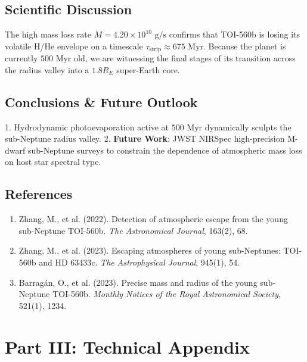 \documentclass[11pt,a4paper]{article}
\begin{document}
\subsection{Scientific Discussion}
The high mass loss rate $\dot{M} = 4.20 \times 10^{10}\text{ g/s}$ confirms that TOI-560b is losing its volatile H/He envelope on a timescale $\tau_{\text{strip}} \approx 675\text{ Myr}$. Because the planet is currently $500\text{ Myr}$ old, we are witnessing the final stages of its transition across the radius valley into a $1.8 R_E$ super-Earth core.

\subsection{Conclusions \& Future Outlook}
1. Hydrodynamic photoevaporation active at $500\text{ Myr}$ dynamically sculpts the sub-Neptune radius valley.
2. \textbf{Future Work}: JWST NIRSpec high-precision M-dwarf sub-Neptune surveys to constrain the dependence of atmospheric mass loss on host star spectral type.

\subsection*{References}
\begin{enumerate}
    \item Zhang, M., et al. (2022). Detection of atmospheric escape from the young sub-Neptune TOI-560b. \textit{The Astronomical Journal}, 163(2), 68.
    \item Zhang, M., et al. (2023). Escaping atmospheres of young sub-Neptunes: TOI-560b and HD 63433c. \textit{The Astrophysical Journal}, 945(1), 54.
    \item Barrag\'an, O., et al. (2023). Precise mass and radius of the young sub-Neptune TOI-560b. \textit{Monthly Notices of the Royal Astronomical Society}, 521(1), 1234.
\end{enumerate}

\newpage

\section*{Part III: Technical Appendix}
\end{document}
